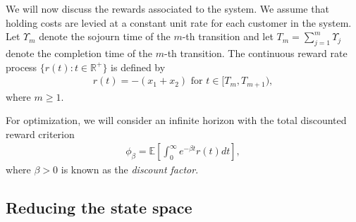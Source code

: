 \documentclass{article}
\theoremstyle{definition}
\theoremstyle{plain}
\begin{document}
We will now discuss the rewards associated to the system. We assume that holding
costs are levied at a constant unit rate for each customer in the system. Let
$\Upsilon_{m}$ denote the sojourn time of the $m$-th transition and let
$T_{m} = \sum_{j=1}^{m} \Upsilon_{j}$ denote the completion time of the $m$-th transition.
The continuous reward rate process $\{ r(t) : t \in \mathbb{R}^{+} \}$ is
defined by
\begin{align}
  r(t) = - (x_{1} + x_{2}) \text{ for } t \in [ T_{m}, T_{m+1} ) ,
\end{align}
where $m \geq 1$.

For optimization, we will consider an infinite horizon with the total discounted
reward criterion
\begin{align}
  \label{eq:criterion}
  \phi_{\beta} = \mathbb{E} \left[ \int_{0}^{\infty} e^{-\beta t} r(t) dt \right] ,
\end{align}
where $\beta > 0$ is known as the \textit{discount factor}.


\subsection{Reducing the state space}
\label{sec:reduced-model}
\end{document}
